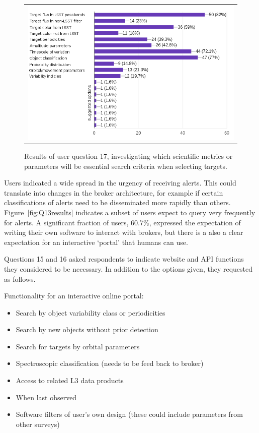 \documentclass{article}
\begin{document}
\begin{figure}[ht]
\centering
\begin{tabular}{c}
\includegraphics[width=5in]{figures/user_question_17.png}
\end{tabular}
\caption{Results of user question 17, investigating which scientific metrics or parameters will be essential search criteria when selecting targets.}
\label{fig:broker_interactions6}
\end{figure}

Users indicated a wide spread in the urgency of receiving alerts.  This could translate into changes in the broker architecture, for example if certain classifications of alerts need to be disseminated more rapidly than others.  
Figure~\ref{fig:Q13results} indicates a subset of users expect to query very frequently for alerts.  A significant fraction of users, 60.7\%, expressed the expectation of writing their own software to interact with brokers, but there is a also a clear expectation for an interactive `portal' that humans can use.  

Questions 15 and 16 asked respondents to indicate website and API functions they considered to be necessary.  In addition to the options given, they requested as follows.  

\noindent Functionality for an interactive online portal:
\begin{itemize}
\item Search by object variability class or periodicities
\item Search by new objects without prior detection
\item Search for targets by orbital parameters
\item Spectroscopic classification (needs to be feed back to broker)
\item Access to related L3 data products
\item When last observed
\item Software filters of user's own design (these could include parameters from other surveys)
\end{itemize}
\end{document}
